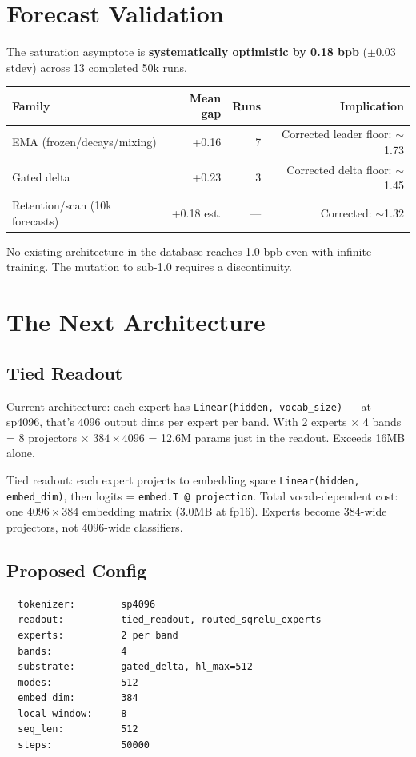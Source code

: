\documentclass[11pt,a4paper]{report}
\begin{document}
\chapter{Forecast Validation}

The saturation asymptote is \textbf{systematically optimistic by 0.18 bpb} ($\pm 0.03$ stdev) across 13 completed 50k runs.

\begin{tabular}{lrrr}
\toprule
\textbf{Family} & \textbf{Mean gap} & \textbf{Runs} & \textbf{Implication} \\
\midrule
EMA (frozen/decays/mixing) & +0.16 & 7 & Corrected leader floor: $\sim$1.73 \\
Gated delta & +0.23 & 3 & Corrected delta floor: $\sim$1.45 \\
Retention/scan (10k forecasts) & +0.18 est. & --- & Corrected: $\sim$1.32 \\
\bottomrule
\end{tabular}

No existing architecture in the database reaches 1.0 bpb even with infinite training. The mutation to sub-1.0 requires a discontinuity.

\chapter{The Next Architecture}

\section{Tied Readout}

Current architecture: each expert has \texttt{Linear(hidden, vocab\_size)} --- at sp4096, that's 4096 output dims per expert per band. With 2 experts $\times$ 4 bands = 8 projectors $\times$ $384 \times 4096$ = 12.6M params just in the readout. Exceeds 16MB alone.

Tied readout: each expert projects to embedding space \texttt{Linear(hidden, embed\_dim)}, then logits = \texttt{embed.T @ projection}. Total vocab-dependent cost: one $4096 \times 384$ embedding matrix (3.0MB at fp16). Experts become $384$-wide projectors, not $4096$-wide classifiers.

\section{Proposed Config}

\begin{verbatim}
  tokenizer:        sp4096
  readout:          tied_readout, routed_sqrelu_experts
  experts:          2 per band
  bands:            4
  substrate:        gated_delta, hl_max=512
  modes:            512
  embed_dim:        384
  local_window:     8
  seq_len:          512
  steps:            50000
\end{verbatim}
\end{document}
